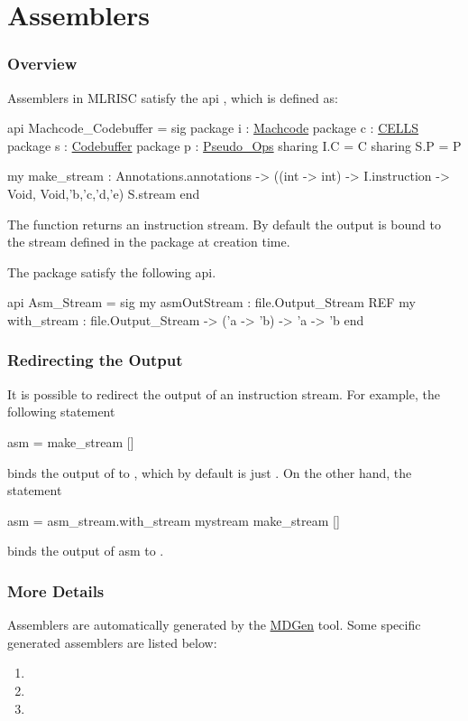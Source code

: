 \section{Assemblers}

\subsubsection{Overview}
Assemblers in MLRISC satisfy the api 
,
which is defined as:
\begin{SML}
api Machcode_Codebuffer =
sig
   package i : \href{instructions.html}{Machcode}
   package c : \href{cells.html}{CELLS}
   package s : \href{streams.html}{Codebuffer}
   package p : \href{pseudo-ops.html}{Pseudo_Ops}
      sharing I.C = C
      sharing S.P = P

   my make_stream : Annotations.annotations ->
                     ((int -> int) -> I.instruction -> Void,
                      Void,'b,'c,'d,'e) S.stream
end
\end{SML}

The function  returns an instruction stream.
By default the output is bound to the stream  
defined in the package 
 at creation time.

The package  satisfy the following api.
\begin{SML}
api Asm_Stream = sig
  my asmOutStream : file.Output_Stream REF
  my with_stream : file.Output_Stream -> ('a -> 'b) -> 'a -> 'b
end
\end{SML}
\subsubsection{Redirecting the Output}
It is possible to redirect the output of an instruction stream.
For example, the following statement
\begin{SML}
   asm = make_stream []
\end{SML}
binds the output of  to , which
by default is just .  On the other hand, the
statement
\begin{SML}
   asm = asm_stream.with_stream mystream make_stream []
\end{SML}
binds the output of asm to .

\subsubsection{More Details}

Assemblers are automatically generated by the 
\href{mlrisc-md.html}{MDGen} tool.  Some specific generated
assemblers are listed below:
\begin{enumerate}
 \item {}
 \item {}
 \item {}
\end{enumerate}

